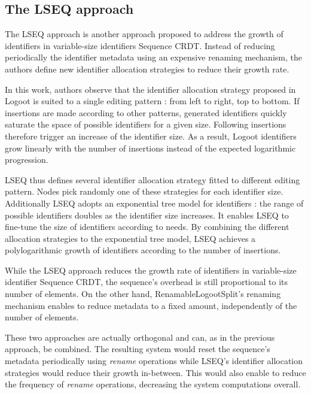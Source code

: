 \documentclass[10pt,journal,compsoc]{IEEEtran}
\begin{document}
\subsection{The LSEQ approach}

The LSEQ approach \cite{nedelec_2013_lseq, doi:10.1002/cpe.4108} is another approach proposed to address the growth of identifiers in variable-size identifiers Sequence \ac{CRDT}. Instead of reducing periodically the identifier metadata using an expensive renaming mechanism, the authors define new identifier allocation strategies to reduce their growth rate.

In this work, authors observe that the identifier allocation strategy proposed in Logoot\cite{WeissICDCS09} is suited to a single editing pattern : from left to right, top to bottom.
If insertions are made according to other patterns, generated identifiers quickly saturate the space of possible identifiers for a given size.
Following insertions therefore trigger an increase of the identifier size.
As a result, Logoot identifiers grow linearly with the number of insertions instead of the expected logarithmic progression.

LSEQ thus defines several identifier allocation strategy fitted to different editing pattern.
Nodes pick randomly one of these strategies for each identifier size.
Additionally LSEQ adopts an exponential tree model for identifiers : the range of possible identifiers doubles as the identifier size increases.
It enables LSEQ to fine-tune the size of identifiers according to needs.
By combining the different allocation strategies to the exponential tree model, LSEQ achieves a polylogarithmic growth of identifiers according to the number of insertions.

While the LSEQ approach reduces the growth rate of identifiers in variable-size identifier Sequence \ac{CRDT}, the sequence's overhead is still proportional to its number of elements.
On the other hand, RenamableLogootSplit's renaming mechanism enables to reduce metadata to a fixed amount, independently of the number of elements.

These two approaches are actually orthogonal and can, as in the previous approach, be combined.
The resulting system would reset the sequence's metadata periodically using \emph{rename} operations while LSEQ's identifier allocation strategies would reduce their growth in-between.
This would also enable to reduce the frequency of \emph{rename} operations, decreasing the system computations overall.
\end{document}
